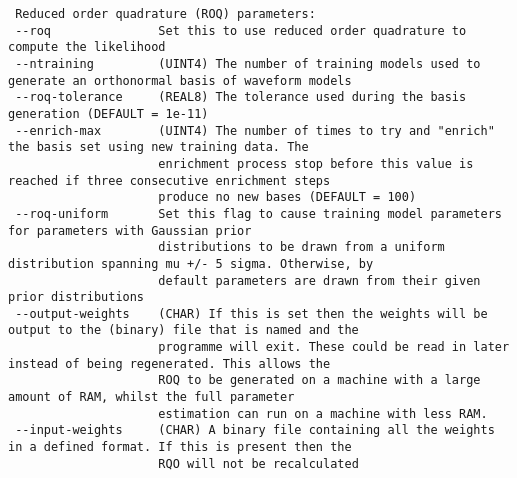 \begin{footnotesize}
\begin{verbatim}
 Reduced order quadrature (ROQ) parameters:
 --roq               Set this to use reduced order quadrature to compute the likelihood
 --ntraining         (UINT4) The number of training models used to generate an orthonormal basis of waveform models
 --roq-tolerance     (REAL8) The tolerance used during the basis generation (DEFAULT = 1e-11)
 --enrich-max        (UINT4) The number of times to try and "enrich" the basis set using new training data. The
                     enrichment process stop before this value is reached if three consecutive enrichment steps
                     produce no new bases (DEFAULT = 100)
 --roq-uniform       Set this flag to cause training model parameters for parameters with Gaussian prior
                     distributions to be drawn from a uniform distribution spanning mu +/- 5 sigma. Otherwise, by
                     default parameters are drawn from their given prior distributions
 --output-weights    (CHAR) If this is set then the weights will be output to the (binary) file that is named and the
                     programme will exit. These could be read in later instead of being regenerated. This allows the
                     ROQ to be generated on a machine with a large amount of RAM, whilst the full parameter
                     estimation can run on a machine with less RAM.
 --input-weights     (CHAR) A binary file containing all the weights in a defined format. If this is present then the
                     RQO will not be recalculated


\end{verbatim}
\end{footnotesize}

